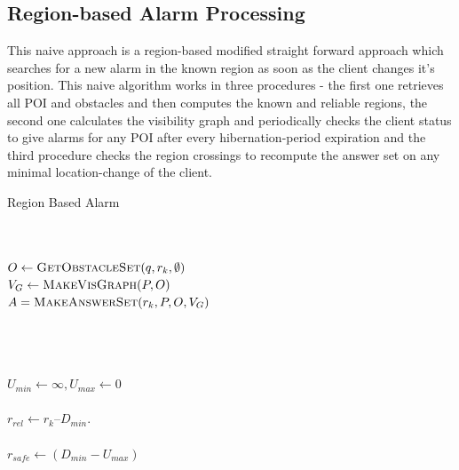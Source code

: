\documentclass{sig-alternate}
\begin{document}
\subsection{Region-based Alarm Processing}
This naive approach is a region-based modified straight forward approach which searches for a new alarm in the known region as soon as the client changes it's position.
This naive algorithm works in three procedures - the first one retrieves all POI and obstacles and then computes the known and reliable regions, the second one calculates the visibility graph and periodically checks the client status to give alarms for any POI after every hibernation-period expiration and the third procedure checks the region crossings to recompute the answer set on any minimal location-change of the client.


\begin{algorithm}
\caption{Region Based Alarm}
\label{InitRegionBase}
\begin{algorithmic}[1]

    \\
	\\ $O \gets \textsc{GetObstacleSet}(q, r_k, \emptyset)$
	\\ $V_G \gets \textsc{MakeVisGraph}(P, O)$	
	\\ \Return $A = \textsc{MakeAnswerSet}(r_k, P, O, V_G)$ 
\EndProcedure
\\

    
	\\ 
	\\
	\\ $U_{min} \gets \infty, U_{max} \gets 0$
	\\ 
	\\ $r_{rel} \gets r_k – D_{min}$.
	\\ 
	\\ \Return $r_{safe} \gets (D_{min}-U_{max})$ 
\EndProcedure


\end{algorithmic}
\end{algorithm}
\end{document}
